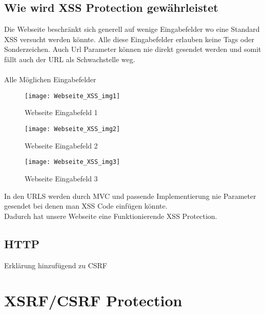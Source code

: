 {\subsection{Wie wird XSS Protection gewährleistet}
\label{sec:xss_prot}
Die Webseite beschränkt sich generell auf wenige Eingabefelder wo eine Standard XSS versucht werden könnte. Alle diese Eingabefelder erlauben keine Tags oder Sonderzeichen. Auch Url Parameter können nie direkt gesendet werden und somit fällt auch der URL als Schwachstelle weg.\\ \\Alle Möglichen Eingabefelder
\begin{figure}[H]
    \texttt{[image: Webseite\_XSS\_img1]}
    \caption{Webseite Eingabefeld 1}
    \label{fig:webxxs1}
\end{figure}
\begin{figure}[H]
    \texttt{[image: Webseite\_XSS\_img2]}
    \caption{Webseite Eingabefeld 2}
    \label{fig:webxxs1}
\end{figure}
\begin{figure}[H]
    \texttt{[image: Webseite\_XSS\_img3]}
    \caption{Webseite Eingabefeld 3}
    \label{fig:webxxs1}
\end{figure}
In den URLS werden durch MVC und passende Implementierung nie Parameter gesendet bei denen man XSS Code einfügen könnte.\\
Dadurch hat unsere Webseite eine Funktionierende XSS Protection.
\subsection{HTTP}
Erklärung hinzufügend zu CSRF
\section{XSRF/CSRF Protection}
\label{sec:csrf}
}
